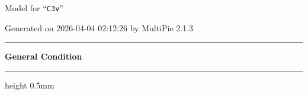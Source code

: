 \documentclass[fleqn,10pt,landscape]{jsarticle}
\begin{document}
\setcounter{MaxMatrixCols}{32}

\renewcommand{\tablename}{Table~}
\renewcommand{\figurename}{Figure~}
\setlength{\baselineskip}{16pt}
\setlength{\parindent}{0pt}
\setlength{\mathindent}{0pt}
\footnotesize
\begin{center}
\LARGE
Model for ``\texttt{C3v}''
\end{center}
\begin{flushright}
Generated on 2026-04-04 02:12:26 by MultiPie 2.1.3
\end{flushright}
\setlength{\baselineskip}{16pt}
\footnotesize
\vspace{5mm}
\noindent \rule[0.5mm]{5mm}{0.5mm}\hspace{3mm}\textbf{General Condition}\hspace{3mm}\leaders\hrule height 0.5mm\hfill\kern0pt
\vspace{3mm}
\end{document}
